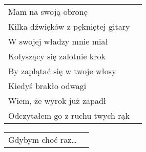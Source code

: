 \documentclass[a5paper]{article}
\begin{document}
\noindent
\begin{tabular}{@{}p{7.50cm}p{3cm}@{}}
Mam na swoją obronę \\
Kilka dźwięków z pękniętej gitary\\
W swojej władzy mnie miał\\
Kołyszący się zalotnie krok\\
By zaplątać się w twoje włosy\\
Kiedyś brakło odwagi\\
Wiem, że wyrok już zapadł\\
Odczytałem go z ruchu twych rąk\\
\end{tabular}

\noindent
\begin{tabular}{@{}p{7.50cm}p{3cm}@{}}
Gdybym choć raz…
\end{tabular}
\end{document}
